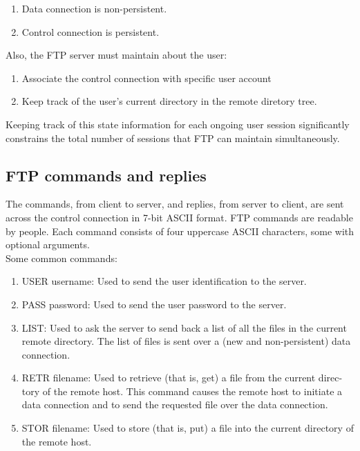 \begin{center}
    \begin{enumerate}
        \item Data connection is non-persistent.
        \item Control connection is persistent.
    \end{enumerate}
\end{center}


Also, the FTP server must maintain  about the user:
\begin{enumerate}
    \item Associate the control connection with specific user account
    \item Keep track of the user's current directory in the remote diretory tree.
\end{enumerate}

Keeping track of this state information for each
ongoing user session significantly constrains the total number of sessions that FTP
can maintain simultaneously.

\subsection{FTP commands and replies}


\hf
The commands, from client to server, and replies, from server to
client, are sent across the control connection in 7-bit ASCII format. FTP commands
are readable by people. Each command consists of four uppercase ASCII characters, some with optional arguments.\\

Some common commands:
\begin{enumerate}
    \item USER username: Used to send the user identification to the server.
    \item PASS password: Used to send the user password to the server.
    \item LIST: Used to ask the server to send back a list of all the files in the current
          remote directory. The list of files is sent over a (new and non-persistent) data
          connection.
    \item RETR filename: Used to retrieve (that is, get) a file from the current direc-
          tory of the remote host. This command causes the remote host to initiate a data
          connection and to send the requested file over the data connection.
    \item STOR filename: Used to store (that is, put) a file into the current directory
          of the remote host.
\end{enumerate}

